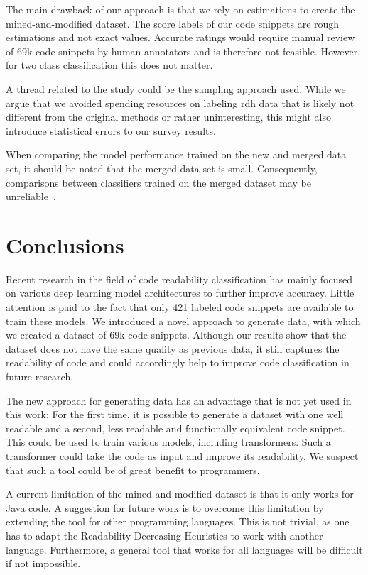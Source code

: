 \documentclass[%
class=scrreprt,
chapterprefix=false,%
open=right,%
twoside=false,%
paper=a4,%
logofile={Logo\_zentral\_farbig\_EN.png},%
thesistype=master,%
UKenglish,%
]{se2thesis}
\theoremstyle{definition}
\newcommand{\numSamples}{69k }
\begin{document}
	The main drawback of our approach is that we rely on estimations to create the mined-and-modified dataset. The score labels of our code snippets are rough estimations and not exact values. Accurate ratings would require manual review of \numSamples code snippets by human annotators and is therefore not feasible. However, for two class classification this does not matter.
	
	A thread related to the study could be the sampling approach used. While we argue that we avoided spending resources on labeling rdh data that is likely not different from the original methods or rather uninteresting, this might also introduce statistical errors to our survey results.
	
	When comparing the model performance trained on the new and merged data set, it should be noted that the merged data set is small. Consequently, comparisons between classifiers trained on the merged dataset may be unreliable~\cite{mi2022towards}.
	
\section{Conclusions} \label{Conclusions}
	Recent research in the field of code readability classification has mainly focused on various deep learning model architectures to further improve accuracy. Little attention is paid to the fact that only 421 labeled code snippets are available to train these models. We introduced a novel approach to generate data, with which we created a dataset of \numSamples code snippets. Although our results show that the dataset does not have the same quality as previous data, it still captures the readability of code and could accordingly help to improve code classification in future research.
	
	The new approach for generating data has an advantage that is not yet used in this work: For the first time, it is possible to generate a dataset with one well readable and a second, less readable and functionally equivalent code snippet. This could be used to train various models, including transformers. Such a transformer could take the code as input and improve its readability. We suspect that such a tool could be of great benefit to programmers.
	
	A current limitation of the mined-and-modified dataset is that it only works for Java code. A suggestion for future work is to overcome this limitation by extending the tool for other programming languages. This is not trivial, as one has to adapt the Readability Decreasing Heuristics to work with another language. Furthermore, a general tool that works for all languages will be difficult if not impossible.
	
\end{document}
